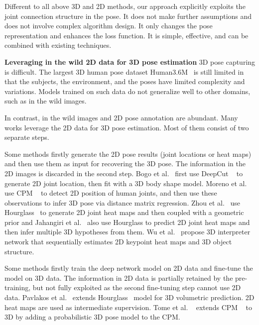 \documentclass[10pt,twocolumn,letterpaper]{article}
\begin{document}
Different to all above 3D and 2D methods, our approach explicitly exploits the joint connection structure in the pose. It does not make further assumptions and does not involve complex algorithm design. It only changes the pose representation and enhances the loss function. It is simple, effective, and can be combined with existing techniques.

\textbf{Leveraging in the wild 2D data for 3D pose estimation} 3D pose capturing is difficult. The largest 3D human pose dataset Human3.6M~\cite{ionescu2014human3} is still limited in that the subjects, the environment, and the poses have limited complexity and variations. Models trained on such data do not generalize well to other domains, such as in the wild images.

In contrast, in the wild images and 2D pose annotation are abundant. Many works leverage the 2D data for 3D pose estimation. Most of them consist of two separate steps.

Some methods firstly generate the 2D pose results (joint locations or heat maps) and then use them as input for recovering the 3D pose. The information in the 2D images is discarded in the second step. Bogo et al.~\cite{bogo2016keep} first use DeepCut ~\cite{pishchulin2016deepcut} to generate 2D joint location, then fit with a 3D body shape model. Moreno et al.~\cite{moreno20163d} use CPM ~\cite{wei2016convolutional} to detect 2D position of human joints, and then use these observations to infer 3D pose via distance matrix regression. Zhou et al.~\cite{zhou2017monocap} use Hourglass~\cite{newell2016stacked} to generate 2D joint heat maps and then coupled with a geometric prior and Jahangiri et al.~\cite{jahangiri2017generating} also use Hourglass to predict 2D joint heat maps and then infer multiple 3D hypotheses from them. Wu et al.~\cite{wu2016single} propose 3D interpreter network that sequentially estimates 2D keypoint heat maps and 3D object structure. 

Some methods firstly train the deep network model on 2D data and fine-tune the model on 3D data. The information in 2D data is partially retained by the pre-training, but not fully exploited as the second fine-tuning step cannot use 2D data. Pavlakos et al.~\cite{pavlakos2016coarse} extends Hourglass~\cite{newell2016stacked} model for 3D volumetric prediction. 2D heat maps are used as intermediate supervision. Tome et al. ~\cite{tome2017lifting} extends CPM ~\cite{wei2016convolutional} to 3D by adding a probabilistic 3D pose model to the CPM.
\end{document}
